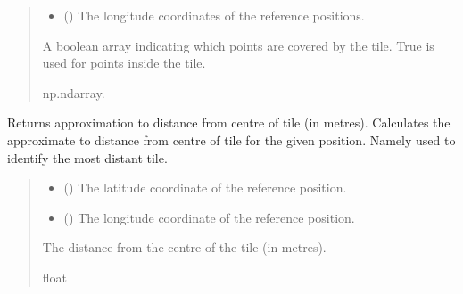 \documentclass[letterpaper,10pt,english]{sphinxmanual}
\begin{document}
\begin{fulllineitems}
\begin{fulllineitems}
\begin{quote}
\begin{description}
\begin{itemize}
\item {} 
\sphinxAtStartPar
{} () \textendash{} The longitude coordinates of the reference positions.

\end{itemize}

\sphinxAtStartPar
A boolean array indicating which points are covered by the
tile. True is used for points inside the tile.

\sphinxAtStartPar
np.ndarray.

\end{description}\end{quote}

\end{fulllineitems}


\begin{fulllineitems}
\label{\detokenize{modules/earth/dted:qnav.earth.dted.DtedTile.distance_to_centre}}
\pysigstartsignatures
{}
\pysigstopsignatures
\sphinxAtStartPar
Returns approximation to distance from centre of tile (in metres).
Calculates the approximate to distance from centre of tile for the
given position. Namely used to identify the most distant tile.
\begin{quote}\begin{description}
\begin{itemize}
\item {} 
\sphinxAtStartPar
{} () \textendash{} The latitude coordinate of the reference position.

\item {} 
\sphinxAtStartPar
{} () \textendash{} The longitude coordinate of the reference position.

\end{itemize}

\sphinxAtStartPar
The distance from the centre of the tile (in metres).

\sphinxAtStartPar
float

\end{description}\end{quote}

\end{fulllineitems}


\end{fulllineitems}
\end{document}
